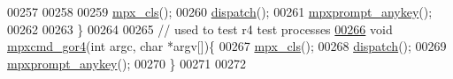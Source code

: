 \begin{DoxyCode}
00257         
00258         
00259         \hyperlink{mpx__util_8c_a8cf3281978ba1652fd5d643e1a41f70b}{mpx_cls}();
00260         \hyperlink{mpx__r3_8c_ad4150c832feb766384417ab7bae70089}{dispatch}();
00261         \hyperlink{mpx__util_8c_a338d01dfe3c80732c00450203c85b964}{mpxprompt_anykey}();
00262         
00263 \}
00264 
00265 \textcolor{comment}{// used to test r4 test processes}
\hypertarget{mpx__r3_8c_source_l00266}{}\hyperlink{_m_p_x___r3_8_h_afff189bf2a21f1da2a30be81b57da08d}{00266} \textcolor{keywordtype}{void} \hyperlink{mpx__r3_8c_afff189bf2a21f1da2a30be81b57da08d}{mpxcmd_gor4}(\textcolor{keywordtype}{int} argc, \textcolor{keywordtype}{char} *argv[])\{
00267         \hyperlink{mpx__util_8c_a8cf3281978ba1652fd5d643e1a41f70b}{mpx_cls}();
00268         \hyperlink{mpx__r3_8c_ad4150c832feb766384417ab7bae70089}{dispatch}();
00269         \hyperlink{mpx__util_8c_a338d01dfe3c80732c00450203c85b964}{mpxprompt_anykey}();
00270 \}
00271 
00272 
\end{DoxyCode}

